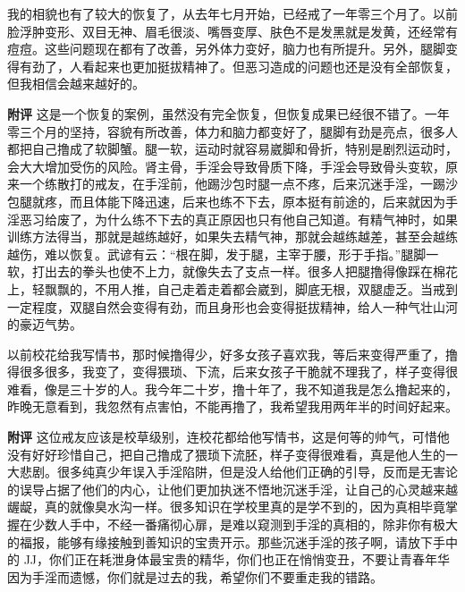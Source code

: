 \begin{case}
    我的相貌也有了较大的恢复了，从去年七月开始，已经戒了一年零三个月了。以前脸浮肿变形、双目无神、眉毛很淡、嘴唇变厚、肤色不是发黑就是发黄，还经常有痘痘。这些问题现在都有了改善，另外体力变好，脑力也有所提升。另外，腿脚变得有劲了，人看起来也更加挺拔精神了。但恶习造成的问题也还是没有全部恢复，但我相信会越来越好的。

    \textbf{附评} 这是一个恢复的案例，虽然没有完全恢复，但恢复成果已经很不错了。一年零三个月的坚持，容貌有所改善，体力和脑力都变好了，腿脚有劲是亮点，很多人都把自己撸成了软脚蟹。腿一软，运动时就容易崴脚和骨折，特别是剧烈运动时，会大大增加受伤的风险。肾主骨，手淫会导致骨质下降，手淫会导致骨头变软，原来一个练散打的戒友，在手淫前，他踢沙包时腿一点不疼，后来沉迷手淫，一踢沙包腿就疼，而且体能下降迅速，后来也练不下去，原本挺有前途的，后来就因为手淫恶习给废了，为什么练不下去的真正原因也只有他自己知道。有精气神时，如果训练方法得当，那就是越练越好，如果失去精气神，那就会越练越差，甚至会越练越伤，难以恢复。武谚有云：“根在脚，发于腿，主宰于腰，形于手指。”腿脚一软，打出去的拳头也使不上力，就像失去了支点一样。很多人把腿撸得像踩在棉花上，轻飘飘的，不用人推，自己走着走着都会崴到，脚底无根，双腿虚乏。当戒到一定程度，双腿自然会变得有劲，而且身形也会变得挺拔精神，给人一种气壮山河的豪迈气势。
\end{case}

\begin{case}
    以前校花给我写情书，那时候撸得少，好多女孩子喜欢我，等后来变得严重了，撸得很多很多，我变了，变得猥琐、下流，后来女孩子干脆就不理我了，样子变得很难看，像是三十岁的人。我今年二十岁，撸十年了，我不知道我是怎么撸起来的，昨晚无意看到，我忽然有点害怕，不能再撸了，我希望我用两年半的时间好起来。

    \textbf{附评} 这位戒友应该是校草级别，连校花都给他写情书，这是何等的帅气，可惜他没有好好珍惜自己，把自己撸成了猥琐下流胚，样子变得很难看，真是他人生的一大悲剧。很多纯真少年误入手淫陷阱，但是没人给他们正确的引导，反而是无害论的误导占据了他们的内心，让他们更加执迷不悟地沉迷手淫，让自己的心灵越来越龌龊，真的就像臭水沟一样。很多知识在学校里真的是学不到的，因为真相毕竟掌握在少数人手中，不经一番痛彻心扉，是难以窥测到手淫的真相的，除非你有极大的福报，能够有缘接触到善知识的宝贵开示。那些沉迷手淫的孩子啊，请放下手中的 JJ，你们正在耗泄身体最宝贵的精华，你们也正在悄悄变丑，不要让青春年华因为手淫而遗憾，你们就是过去的我，希望你们不要重走我的错路。
\end{case}


